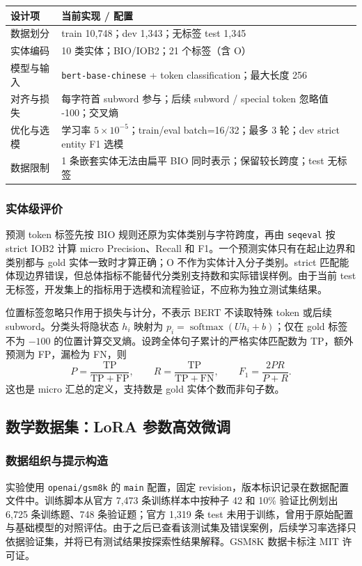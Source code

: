 \documentclass[UTF8,a4paper,12pt,fontset=none]{ctexart}
\begin{document}
\noindent\begin{tabularx}{\textwidth}{>{\raggedright\arraybackslash}p{}Y}
\toprule
设计项 & 当前实现 / 配置 \\
\midrule
数据划分 & train 10,748；dev 1,343；无标签 test 1,345 \\
实体编码 & 10 类实体；BIO/IOB2；21 个标签（含 O） \\
模型与输入 & \texttt{bert-base-chinese} + token classification；最大长度 256 \\
对齐与损失 & 每字符首 subword 参与；后续 subword / special token 忽略值 -100；交叉熵 \\
优化与选模 & 学习率 $5\times10^{-5}$；train/eval batch=16/32；最多 3 轮；dev strict entity F1 选模 \\
数据限制 & 1 条嵌套实体无法由扁平 BIO 同时表示；保留较长跨度；test 无标签 \\
\bottomrule
\end{tabularx}

\subsubsection{实体级评价}
预测 token 标签先按 BIO 规则还原为实体类别与字符跨度，再由 \texttt{seqeval} 按 strict IOB2 计算 micro Precision、Recall 和 F1。一个预测实体只有在起止边界和类别都与 gold 实体一致时才算正确；O 不作为实体计入分子类别。strict 匹配能体现边界错误，但总体指标不能替代分类别支持数和实际错误样例。由于当前 test 无标签，开发集上的指标用于选模和流程验证，不应称为独立测试集结果。

位置标签忽略只作用于损失与计分，不表示 BERT 不读取特殊 token 或后续 subword。分类头将隐状态 $h_i$ 映射为 $p_i=\operatorname{softmax}(Uh_i+b)$；仅在 gold 标签不为 $-100$ 的位置计算交叉熵。设跨全体句子累计的严格实体匹配数为 TP，额外预测为 FP，漏检为 FN，则
\[
 P=\frac{\mathrm{TP}}{\mathrm{TP}+\mathrm{FP}},\qquad
 R=\frac{\mathrm{TP}}{\mathrm{TP}+\mathrm{FN}},\qquad
 F_1=\frac{2PR}{P+R}.
\]
这也是 micro 汇总的定义，支持数是 gold 实体个数而非句子数。

\subsection{数学数据集：LoRA 参数高效微调}

\subsubsection{数据组织与提示构造}
实验使用 \texttt{openai/gsm8k} 的 \texttt{main} 配置，固定 revision，版本标识记录在数据配置文件中。训练脚本从官方 7,473 条训练样本中按种子 42 和 10\% 验证比例划出 6,725 条训练题、748 条验证题；官方 1,319 条 test 未用于训练，曾用于原始配置与基础模型的对照评估。由于之后已查看该测试集及错误案例，后续学习率选择只依据验证集，并将已有测试结果按探索性结果解释。GSM8K 数据卡标注 MIT 许可证\cite{gsm8k,gsm8k_data}。
\end{document}
